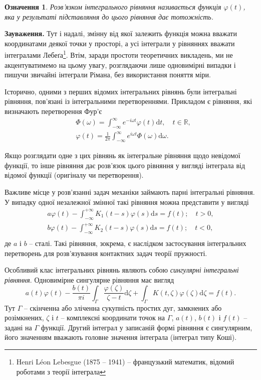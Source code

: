 \documentclass[14pt,twoside]{extreport}
\theoremstyle{mystyle}
\newtheorem{dfn}{Означення}
\numberwithin{equation}{chapter}
\begin{document}
\begin{dfn}
Розв'язком інтегрального рівняння називається функція $\varphi (t)$, яка у результаті підставляння до цього рівняння дає тотожність.
\end{dfn}

\textbf{Зауваження.} Тут і надалі, змінну від якої залежить функція можна вважати координатами деякої точки у просторі, а усі інтеграли у рівняннях вважати інтегралами Лебеґа\footnote{Henri L\'{e}on Lebesgue (1875 -- 1941) -- французький математик, відомий роботами з теорії інтеграла}. Втім, заради простоти теоретичних викладень, ми не акцентуватимемо на цьому увагу, розглядаючи лише одновимірні випадки і пишучи звичайні інтеграли Рімана, без використання поняття міри.

Історично, одними з перших відомих інтегральних рівнянь були інтегральні рівняння, пов'язані із інтегральними перетвореннями. Прикладом є рівняння, які визначають перетворення Фур'є
\begin{align*}
&\Phi(\omega)=\displaystyle\int _{-\infty} ^{\infty}  e^{-i\omega t} \varphi(t)\mathrm{d}t,\quad t\in \mathbb{R},\\
&\varphi(t)=\frac{1}{2\pi} \int _{-\infty} ^{\infty}  e^{i\omega t} \Phi(\omega)\mathrm{d}\omega.
\end{align*}

Якщо розглядати одне з цих рівнянь як інтегральне рівняння щодо невідомої функції, то інше рівняння дає розв'язок цього рівняння у вигляді інтеграла від відомої функції (оригіналу чи перетворення).

Важливе місце у розв'язанні задач механіки займають парні інтегральні рівняння. У випадку одної незалежної змінної такі рівняння можна представити у вигляді
\begin{equation*}
\begin{array}{l}
\displaystyle a \varphi(t) - \int_{-\infty}^{+\infty} K_1(t-s) \varphi(s) \mathrm{d}s = f(t); \quad t>0,\\
\displaystyle b \varphi(t) - \int_{-\infty}^{+\infty} K_2(t-s) \varphi(s) \mathrm{d}s = f(t); \quad t<0,\\
\end{array}
\end{equation*}
де $a$ і $b$ -- сталі. Такі рівняння, зокрема, є наслідком застосування інтегральних перетворень для розв'язування контактних задач теорії пружності.

Особливий клас інтегральних рівнянь являють собою \emph{сингулярні інтегральні рівняння}. Одновимірне сингулярне рівняння має вигляд
\begin{equation*}
a(t)\varphi(t) - \frac{b(t)}{\pi i} \int_{\Gamma}\frac{\varphi(\zeta)}{\zeta - t} \mathrm{d}\zeta + \int_{\Gamma} K(t, \zeta) \varphi(\zeta) \mathrm{d}\zeta = f(t).
\end{equation*}
Тут $\Gamma$ -- скінченна або зліченна сукупність простих дуг, замкнених або розімкнених, $\zeta$ і $t$ -- комплексні координати точок на $\Gamma$, $a(t)$, $b(t)$ і $f(t)$ -- задані на $\Gamma$ функції. Другий інтеграл у записаній формі рівняння є сингулярним, його значенням вважають головне значення інтеграла (інтеграл типу Коші).
\end{document}
